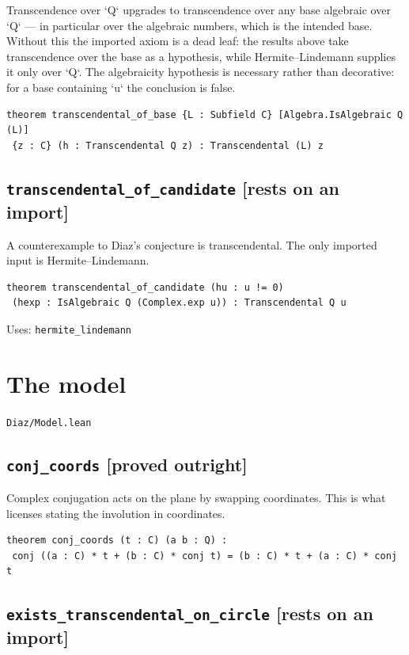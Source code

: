 \documentclass[11pt,a4paper]{article}
\newcommand{\tagon}{\textcolor{onaxc}{\textbf{[rests on an import]}}}
\newcommand{\tagpr}{\textcolor{provedc}{\textbf{[proved outright]}}}
\begin{document}
Transcendence over `Q` upgrades to transcendence over any base algebraic over `Q` --- in particular over the algebraic numbers, which is the intended base. Without this the imported axiom is a dead leaf: the results above take transcendence over the base as a hypothesis, while Hermite--Lindemann supplies it only over `Q`. The algebraicity hypothesis is necessary rather than decorative: for a base containing `u` the conclusion is false.

\begin{lstlisting}
theorem transcendental_of_base {L : Subfield C} [Algebra.IsAlgebraic Q (L)]
 {z : C} (h : Transcendental Q z) : Transcendental (L) z
\end{lstlisting}

\subsection*{\texttt{transcendental\_of\_candidate} \hfill \tagon}

A counterexample to Diaz's conjecture is transcendental. The only imported input is Hermite--Lindemann.

\begin{lstlisting}
theorem transcendental_of_candidate (hu : u != 0)
 (hexp : IsAlgebraic Q (Complex.exp u)) : Transcendental Q u
\end{lstlisting}
\noindent\footnotesize Uses: \texttt{hermite\_lindemann}\normalsize


\section{The model}
\noindent\texttt{Diaz/Model.lean}


\subsection*{\texttt{conj\_coords} \hfill \tagpr}

Complex conjugation acts on the plane by swapping coordinates. This is what licenses stating the involution in coordinates.

\begin{lstlisting}
theorem conj_coords (t : C) (a b : Q) :
 conj ((a : C) * t + (b : C) * conj t) = (b : C) * t + (a : C) * conj t
\end{lstlisting}

\subsection*{\texttt{exists\_transcendental\_on\_circle} \hfill \tagon}
\end{document}
